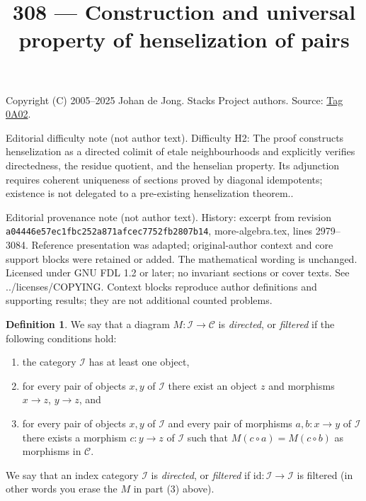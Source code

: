 \documentclass{amsart}
\theoremstyle{plain}
\theoremstyle{definition}
\newtheorem{definition}[subsection]{Definition}
\theoremstyle{remark}
\numberwithin{equation}{subsection}
\begin{document}
\title[Stacks Project, Tag 0A02]{308 --- Construction and universal property of henselization of pairs}
\maketitle
\noindent Copyright (C) 2005--2025 Johan de Jong. Stacks Project authors. Source: \href{https://stacks.math.columbia.edu/tag/0A02}{Tag 0A02}.

\noindent Editorial difficulty note (not author text). Difficulty H2: The proof constructs henselization as a directed colimit of etale neighbourhoods and explicitly verifies directedness, the residue quotient, and the henselian property. Its adjunction requires coherent uniqueness of sections proved by diagonal idempotents; existence is not delegated to a pre-existing henselization theorem..

\noindent Editorial provenance note (not author text). History: excerpt from revision \texttt{a0444\allowbreak 6e57e\allowbreak c1fbc\allowbreak 252a8\allowbreak 71afc\allowbreak ec775\allowbreak 2fb28\allowbreak 07b14}, more-algebra.tex, lines 2979--3084. Reference presentation was adapted; original-author context and core support blocks were retained or added. The mathematical wording is unchanged. Licensed under GNU FDL 1.2 or later; no invariant sections or cover texts. See ../licenses/COPYING. Context blocks reproduce author definitions and supporting results; they are not additional counted problems.

\begin{definition}
\label{categories-definition-directed}
We say that a diagram $M : \mathcal{I} \to \mathcal{C}$ is {\it directed},
or {\it filtered} if the following conditions hold:
\begin{enumerate}
\item the category $\mathcal{I}$ has at least one object,
\item for every pair of objects $x, y$ of $\mathcal{I}$
there exist an object $z$ and morphisms $x \to z$,
$y \to z$, and
\item for every pair of objects $x, y$ of $\mathcal{I}$
and every pair of morphisms $a, b : x \to y$ of $\mathcal{I}$
there exists a morphism $c : y \to z$ of $\mathcal{I}$
such that $M(c \circ a) = M(c \circ b)$ as morphisms in $\mathcal{C}$.
\end{enumerate}
We say that an index category $\mathcal{I}$ is {\it directed}, or
{\it filtered} if $\text{id} : \mathcal{I} \to \mathcal{I}$ is filtered
(in other words you erase the $M$ in part (3) above).
\end{definition}
\end{document}
